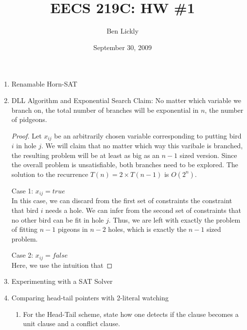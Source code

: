 \documentclass{amsart}
\title{EECS 219C: HW \#1}
\author{Ben Lickly}
\date{September 30, 2009}
\begin{document}
\begin{enumerate}
  \item Renamable Horn-SAT
  \item DLL Algorithm and Exponential Search
Claim: No matter which variable we branch on, the total number of branches
will be exponential in $n$, the number of pidgeons.
\begin{proof}
Let $x_{ij}$ be an arbitrarily chosen variable corresponding to putting bird
$i$ in hole $j$.
We will claim that no matter which way this varibale is branched, the
resulting problem will be at least as big as an $n-1$ sized version.
Since the overall problem is unsatisfiable, both branches need to be explored.
The solution to the recurrence $T(n) = 2\times T(n-1)$ is $O(2^n)$.

Case 1: $x_{ij} = true$ \\
In this case, we can discard from the first set of constraints
the constraint that bird $i$ needs a hole.
We can infer from the second set of constraints that no other bird
can be fit in hole $j$.
Thus, we are left with exactly the problem of fitting $n-1$ pigeons
in $n-2$ holes, which is exactly the $n-1$ sized problem.

Case 2: $x_{ij} = false$ \\
Here, we use the intuition that %

\end{proof}
  \item Experimenting with a SAT Solver
  \item Comparing head-tail pointers with 2-literal watching
    \begin{enumerate}
      \item For the Head-Tail scheme, state how one detects if the clause becomes a unit clause and a conflict clause.


\end{enumerate}
\end{enumerate}
\end{document}
